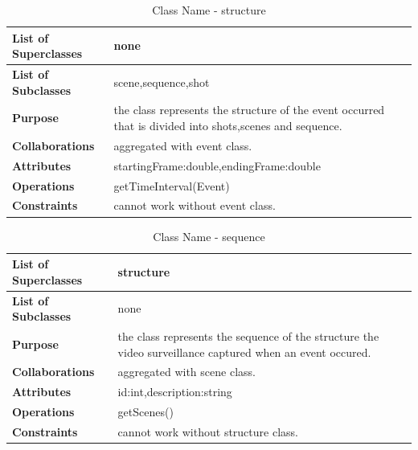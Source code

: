 \documentclass[12pt]{article}
\begin{document}
\begin{table}[h!]
\caption{Class Name - structure}
\label{tab:my-table}
\begin{tabular}{|p{}|p{}|}


 \hline
\textbf{List of Superclasses}  &    none                                               
\\ \hline
\textbf{List of Subclasses}    & scene,sequence,shot                                                                  
\\ \hline
\textbf{Purpose}               & the class represents the structure of the event occurred that is divided into shots,scenes and sequence.
\\ \hline
\textbf{Collaborations}        & aggregated with event class. 
\\ \hline
\textbf{Attributes}  & startingFrame:double,endingFrame:double
\\ \hline
\textbf{Operations} & getTimeInterval(Event)
\\ \hline
\textbf{Constraints} & cannot work without event class.
\\ \hline
\end{tabular}
\end{table}

\begin{table}[h!]
\caption{Class Name - sequence}
\label{tab:my-table}
\begin{tabular}{|p{}|p{}|}


 \hline
\textbf{List of Superclasses}  &    structure                                              
\\ \hline
\textbf{List of Subclasses}    & none                                                                 
\\ \hline
\textbf{Purpose}               & the class represents the sequence of the structure the video surveillance captured when an event occured.
\\ \hline
\textbf{Collaborations}        & aggregated with scene class. 
\\ \hline
\textbf{Attributes}  & id:int,description:string
\\ \hline
\textbf{Operations} & getScenes()
\\ \hline
\textbf{Constraints} & cannot work without structure class.
\\ \hline
\end{tabular}
\end{table}
\end{document}
